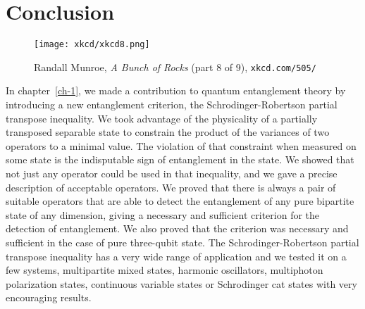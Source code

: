 \chapter*{Conclusion}

\begin{figure}[h]
    \captionsetup{labelformat=empty}
     \texttt{[image: xkcd/xkcd8.png]}
    \caption*{  Randall Munroe, \emph{A Bunch of Rocks} (part 8 of 9), \texttt{xkcd.com/505/} }
\end{figure}


In chapter~\ref{ch-1}, we made a contribution to quantum entanglement theory by introducing a new entanglement criterion, the Schrodinger-Robertson partial transpose inequality. We took advantage of the physicality of a partially transposed separable state to constrain the product of the variances of two operators to a minimal value. The violation of that constraint when measured on some state is the indisputable sign of entanglement in the state. We showed that not just any operator could be used in that inequality, and we gave a precise description of acceptable operators. We proved that there is always a pair of suitable operators that are able to detect the entanglement of any pure bipartite state of any dimension, giving a necessary and sufficient criterion for the detection of entanglement. We also proved that the criterion was necessary and sufficient in the case of pure three-qubit state. The Schrodinger-Robertson partial transpose inequality has a very wide range of application and we tested it on a few systems, multipartite mixed states, harmonic oscillators, multiphoton polarization states, continuous variable states or Schrodinger cat states with very encouraging results.

